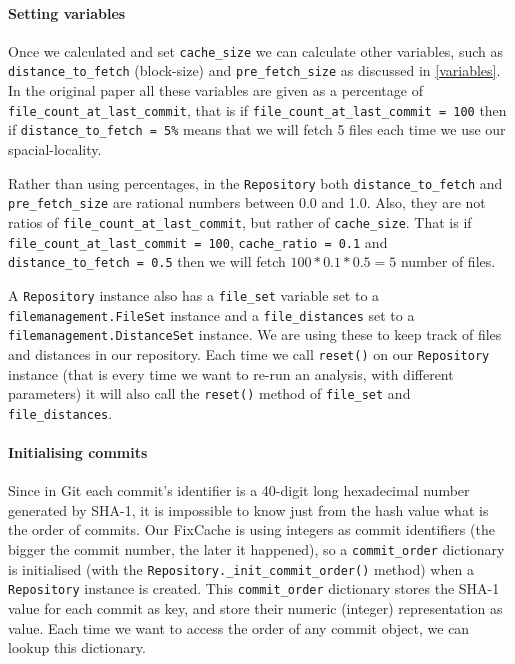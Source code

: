 \documentclass[12pt,twoside,notitlepage]{report}
\newcommand{\fxch}{FixCache }
\begin{document}
\paragraph{Setting variables} Once we calculated and set \texttt{cache\_size} we can calculate other variables, such as \texttt{distance\_to\_fetch} (block-size) and \texttt{pre\_fetch\_size} as discussed in \ref{variables}. In the original paper all these variables are given as a percentage of \texttt{file\_count\_at\_last\_commit}, that is if \texttt{file\_count\_at\_last\_commit = 100} then if \texttt{distance\_to\_fetch = 5\%} means that we will fetch 5 files each time we use our spacial-locality.

Rather than using percentages, in the \texttt{Repository} both \texttt{distance\_to\_fetch} and \texttt{pre\_fetch\_size} are rational numbers between 0.0 and 1.0. Also, they are not ratios of \texttt{file\_count\_at\_last\_commit}, but rather of \texttt{cache\_size}. That is if \texttt{file\_count\_at\_last\_commit = 100}, \texttt{cache\_ratio = 0.1} and \texttt{distance\_to\_fetch = 0.5} then we will fetch $100*0.1*0.5 = 5$ number of files.

A \texttt{Repository} instance also has a \texttt{file\_set} variable set to a \texttt{filemanagement.FileSet} instance and a \texttt{file\_distances} set to a \texttt{filemanagement.DistanceSet} instance. We are using these to keep track of files and distances in our repository. Each time we call \texttt{reset()} on our \texttt{Repository} instance (that is every time we want to re-run an analysis, with different parameters) it will also call the \texttt{reset()} method of \texttt{file\_set} and \texttt{file\_distances}.

\paragraph{Initialising commits} Since in Git each commit's identifier is a 40-digit long hexadecimal number generated by SHA-1, it is impossible to know just from the hash value what is the order of commits. Our \fxch is using integers as commit identifiers (the bigger the commit number, the later it happened), so a \texttt{commit\_order} dictionary is initialised (with the \texttt{Repository.\_init\_commit\_order()} method) when a \texttt{Repository} instance is created. This \texttt{commit\_order} dictionary stores the SHA-1 value for each commit as key, and store their numeric (integer) representation as value. Each time we want to access the order of any commit object, we can lookup this dictionary.
\end{document}
